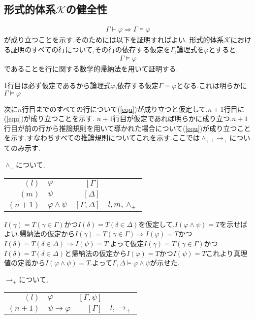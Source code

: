 \documentclass[10pt,b5paper,papersize,dvipdfmx]{jsbook}
\begin{document}
\subsection{形式的体系$\mathcal K$の健全性}
\begin{align}
\Gamma \vdash \varphi \Rightarrow \Gamma \models \varphi
\end{align}
が成り立つことを示す.そのためには以下を証明すればよい.
形式的体系$\mathcal K$における証明のすべての行について,その行の依存する仮定を$\Gamma$,論理式を$\varphi$とすると,
\begin{align}
\label{equ} \Gamma \models \varphi
\end{align}
であることを行に関する数学的帰納法を用いて証明する.\par
1行目は必ず仮定であるから論理式$\varphi$,依存する仮定$\Gamma = \varphi$となる.これは明らかに$\Gamma \models \varphi$ \par
次に$n$行目までのすべての行について(\ref{equ})が成り立つと仮定して,$n+1$行目に(\ref{equ})が成り立つことを示す.
$n+1$行目が仮定であれば明らかに成り立つ.$n+1$行目が前の行から推論規則を用いて導かれた場合について(\ref{equ})が成り立つことを示す.すなわちすべての推論規則についてこれを示す.ここでは$\land_+,\to_+$についてのみ示す.\par
$\land_+$について,
\begin{table}[H]
\begin{tabular}{rlrl}
$(l)$&$\varphi$&$[\Gamma]$& \\
$(m)$&$\psi$&$[\Delta]$& \\
$(n+1)$&$\varphi \land \psi$&$[\Gamma,\Delta]$&$l,m,\land_+$
\end{tabular}
\end{table}
$I(\gamma)=T(\gamma \in \Gamma)$かつ$I(\delta)=T(\delta \in \Delta)$を仮定して,$I(\varphi \land \psi)=T$を示せばよい.帰納法の仮定から$I(\gamma)=T(\gamma \in \Gamma)\Rightarrow I(\varphi)=T$かつ$I(\delta)=T(\delta \in \Delta)\Rightarrow I(\psi)=T$.よって仮定$I(\gamma)=T(\gamma \in \Gamma)$かつ$I(\delta)=T(\delta \in \Delta)$と帰納法の仮定から$I(\varphi)=T$かつ$I(\psi)=T$これより真理値の定義から$I(\varphi \land \psi)=T$.よって$\Gamma,\Delta \models \varphi \land \psi$が示せた.\par
$\to_+$について,
\begin{table}[H]
\begin{tabular}{rlrl}
$(l)$&$\varphi$&$[\Gamma,\psi]$& \\
$(n+1)$&$\psi \to \varphi$&$[\Gamma]$&$l,\to_+$ \\
\end{tabular}
\end{table}
\end{document}
